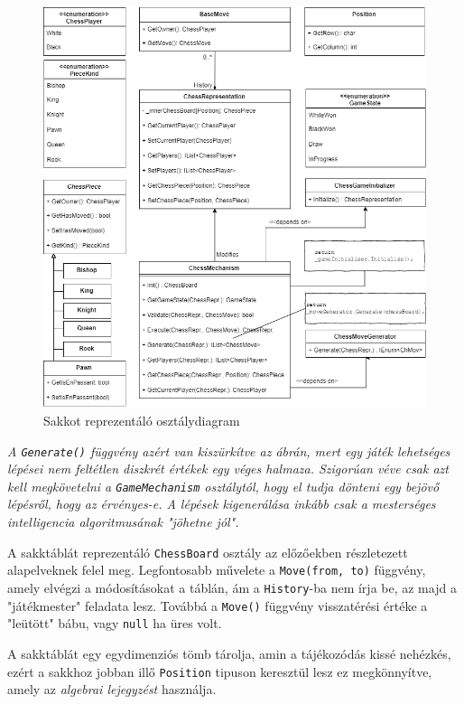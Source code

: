 \documentclass[twoside, a4paper, 12pt]{book}
\begin{document}
\begin{figure}[htbp]
	\centering
	\includegraphics[width=\textwidth]{img/chessClassDiagram.png}
	\caption{Sakkot reprezentáló osztálydiagram}
	\label{fig:chessClassDiagram}
\end{figure}

\textit{A \texttt{Generate()} függvény azért van kiszürkítve az ábrán, mert egy játék lehetséges lépései nem feltétlen diszkrét értékek egy véges halmaza. Szigorúan véve csak azt kell megkövetelni a \texttt{GameMechanism} osztálytól, hogy el tudja dönteni egy bejövő lépésről, hogy az érvényes-e. A lépések kigenerálása inkább csak a mesterséges intelligencia algoritmusának "jöhetne jól".}

A sakktáblát reprezentáló \texttt{ChessBoard} osztály az előzőekben részletezett alapelveknek felel meg. Legfontosabb művelete a \texttt{Move(from, to)} függvény, amely elvégzi a módosításokat a táblán, ám a \texttt{History}-ba nem írja be, az majd a "játékmester" feladata lesz. Továbbá a \texttt{Move()} függvény visszatérési értéke a "leütött" bábu, vagy \texttt{null} ha üres volt.

A sakktáblát egy egydimenziós tömb tárolja, amin a tájékozódás kissé nehézkés, ezért a sakkhoz jobban illő \texttt{Position} tipuson keresztül lesz ez megkönnyítve, amely az \textit{algebrai lejegyzést} használja.
\end{document}
